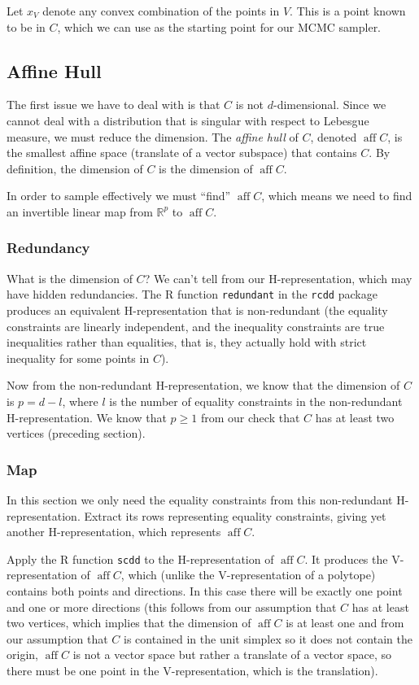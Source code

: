 \documentclass[11pt]{article}
\DeclareMathOperator{\aff}{aff}
\newcommand{\real}{\mathbb{R}}
\begin{document}
Let $x_V$ denote any convex combination of the points in $V$.
This is a point known to be in $C$, which we can use as the starting
point for our MCMC sampler.

\subsection{Affine Hull}

The first issue we have to deal with is that $C$ is not $d$-dimensional.
Since we cannot deal with a distribution that is singular with respect to
Lebesgue measure, we must reduce the dimension.  The \emph{affine hull}
of $C$, denoted $\aff C$, is the smallest affine space (translate of a
vector subspace) that contains $C$.  By definition, the dimension of $C$
is the dimension of $\aff C$.

In order to sample effectively we must ``find'' $\aff C$, which means
we need to find an invertible linear map from $\real^p$ to $\aff C$.

\subsubsection{Redundancy}

What is the dimension of $C$?  We can't tell from our H-representation,
which may have hidden redundancies.  The R function \texttt{redundant}
in the \texttt{rcdd} package produces an equivalent H-representation that
is non-redundant (the equality constraints are linearly independent,
and the inequality constraints are true inequalities rather than equalities,
that is, they actually hold with strict inequality for some points in $C$).

Now from the non-redundant H-representation, we know that the dimension of
$C$ is $p = d - l$, where $l$ is the number of equality constraints in the
non-redundant H-representation.  We know that $p \ge 1$ from our check that
$C$ has at least two vertices (preceding section).

\subsubsection{Map}

In this section we only need the equality constraints from
this non-redundant H-representation.  Extract its rows
representing equality constraints, giving yet another H-representation,
which represents $\aff C$.

Apply the R function \texttt{scdd} to the H-representation of $\aff C$.
It produces the V-representation of $\aff C$, which (unlike the
V-representation of a polytope) contains both points and directions.
In this case there will be exactly one point and one or more directions
(this follows from our assumption that $C$ has at least two vertices,
which implies that the dimension of $\aff C$ is at least one and from
our assumption that $C$ is contained in the unit simplex so it does
not contain the origin, $\aff C$ is not a vector space but rather a
translate of a vector space, so there must be one point in the
V-representation, which is the translation).
\end{document}
